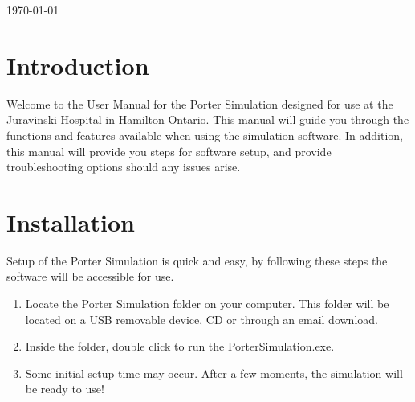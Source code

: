 \documentclass[paper=letter, fontsize=10pt]{scrartcl}
\numberwithin{equation}{section}		%
\numberwithin{figure}{section}			%
\numberwithin{table}{section}				%
\begin{document}
\begin{titlepage}
\begin{center}


{\large \today}\\[3cm] %


 

\vfill %
\end{center}
\end{titlepage}

\setcounter{tocdepth}{2}

\tableofcontents

\newpage
\section{Introduction}
Welcome to the User Manual for the Porter Simulation designed for use at the Juravinski Hospital in Hamilton Ontario. This manual will guide you through the functions and features available when using the simulation software. In addition, this manual will provide you steps for software setup, and provide troubleshooting options should any issues arise.

\section{Installation}
Setup of the Porter Simulation is quick and easy, by following these steps the software will be accessible for use.
\begin{enumerate}
	\item Locate the Porter Simulation folder on your computer. This folder will be located on a USB removable device, CD or through an email download.
	\item Inside the folder, double click to run the PorterSimulation.exe.
	\item Some initial setup time may occur. After a few moments, the simulation will be ready to use!
\end{enumerate}
\end{document}
